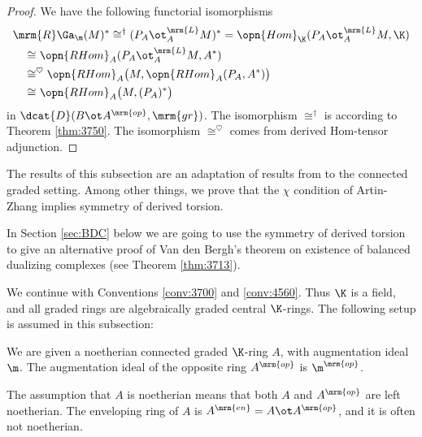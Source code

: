 \begin{proof}
We have the following functorial isomorphisms
\[ \begin{aligned}
& \mrm{R} \Ga_{\m}(M)^* \cong^{\dag} (P_A \ot^{\mrm{L}}_{A} M)^* 
= \opn{Hom}_{\K}(P_A \ot^{\mrm{L}}_{A} M, \K )
\\ & 
\quad \cong^{} \opn{RHom}_A(P_A \ot^{\mrm{L}}_{A} M, A^* )
\\ & 
\quad \cong^{\heartsuit} \opn{RHom}_A \bigl( M, 
\opn{RHom}_A(P_A , A^* ) \bigr) 
\\ & 
\quad \cong^{} \opn{RHom}_A \bigl( M, (P_A)^* \bigr) 
\end{aligned} \]
in $\dcat{D}(B \ot A^{\mrm{op}}, \mrm{gr})$.
The isomorphism $\cong^{\dag}$ is according to Theorem \ref{thm:3750}.
The isomorphism $\cong^{\heartsuit}$ comes from derived Hom-tensor adjunction.
\end{proof}




\label{subsec:sym-der-tor}

The results of this subsection are an adaptation of results from 
\cite[Section 8]{VyYe} to the connected graded setting. 
Among other things, we prove that the $\chi$ condition of Artin-Zhang implies 
symmetry of derived torsion. 

In Section \ref{sec:BDC} below we are going to use the symmetry of derived 
torsion to give an alternative proof of Van den Bergh's theorem on existence of 
balanced dualizing complexes (see Theorem \ref{thm:3713}). 

We continue with Conventions \ref{conv:3700}  and \ref{conv:4560}.
Thus $\K$ is a field, and all graded rings are algebraically graded central 
$\K$-rings. The following setup is assumed in this subsection: 

\begin{setup} \label{setup:3855} 
We are given a noetherian connected graded $\K$-ring $A$, with augmentation 
ideal $\m$. The augmentation ideal of the opposite ring $A^{\mrm{op}}$ is 
$\m^{\mrm{op}}$.
\end{setup}

The assumption that $A$ is noetherian means that   
both $A$ and $A^{\mrm{op}}$ are left noetherian. 
The enveloping ring of $A$ is 
$A^{\mrm{en}} = A \ot A^{\mrm{op}}$, and it is often not noetherian.


